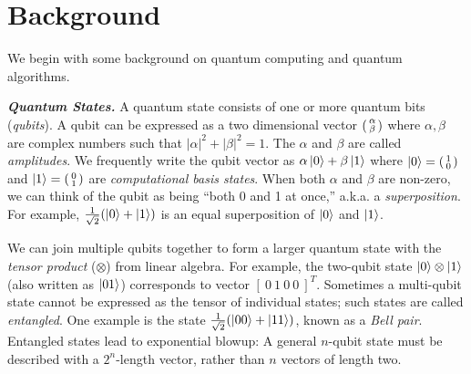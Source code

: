\section{Background}
\label{sec:background}

We begin with some background on quantum computing and quantum algorithms. 

\noindent\textbf{\textit{Quantum States.}} A quantum state consists of one or more quantum bits (\emph{qubits}). A qubit can be expressed as a two dimensional vector $\begin{psmallmatrix} \alpha \\ \beta \end{psmallmatrix}$ where $\alpha,\beta$ are complex numbers such that $|\alpha|^2 + |\beta|^2 = 1$.  The $\alpha$ and $\beta$ are called \emph{amplitudes}. 
%
We frequently write the qubit vector as $\alpha\ket{0} + \beta\ket{1}$ where $\ket{0} = \begin{psmallmatrix} 1 \\ 0 \end{psmallmatrix}$ and $\ket{1} = \begin{psmallmatrix} 0 \\ 1 \end{psmallmatrix}$ are \emph{computational basis states}. When both $\alpha$ and $\beta$ are non-zero, we can think of the qubit as being ``both 0 and 1 at once,'' a.k.a. a \emph{superposition}. For example, $\frac{1}{\sqrt{2}}(\ket{0} + \ket{1})$ is an equal superposition of $\ket{0}$ and $\ket{1}$. 

We can join multiple qubits together to form a larger quantum state with the \emph{tensor product} ($\otimes$) from linear algebra. For example, the two-qubit state $\ket{0} \otimes \ket{1}$ (also written as $\ket{01}$) corresponds to vector $[~0~1~0~0~]^T$. 
Sometimes a multi-qubit state cannot be expressed as the tensor of individual states; such states are called \emph{entangled}. One example is the state $\frac{1}{\sqrt{2}}(\ket{00} + \ket{11})$, known as a \emph{Bell pair}.
Entangled states lead to exponential blowup: A general $n$-qubit state must be described with a $2^n$-length vector, rather than $n$ vectors of length two.

